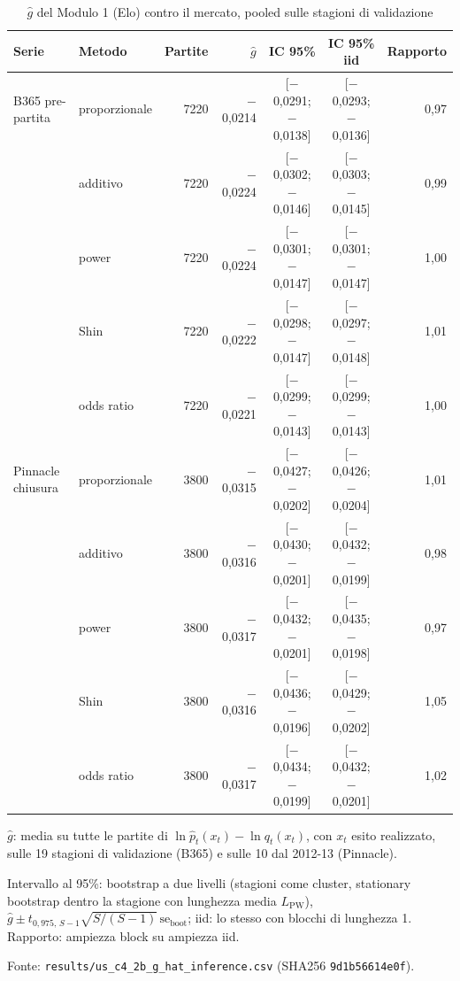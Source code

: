 \begin{table}[htbp]
\centering
\small
\caption{$\hat g$ del Modulo 1 (Elo) contro il mercato, pooled sulle stagioni di validazione}
\label{tab:c4_2_g_hat}
\begin{tabular}{llrrccr}
\toprule
Serie & Metodo & Partite & $\hat g$ & IC 95\% & IC 95\% iid & Rapporto \\
\midrule
B365 pre-partita & proporzionale & 7220 & $-$0,0214 & [$-$0,0291; $-$0,0138] & [$-$0,0293; $-$0,0136] & 0,97 \\
 & additivo & 7220 & $-$0,0224 & [$-$0,0302; $-$0,0146] & [$-$0,0303; $-$0,0145] & 0,99 \\
 & power & 7220 & $-$0,0224 & [$-$0,0301; $-$0,0147] & [$-$0,0301; $-$0,0147] & 1,00 \\
 & Shin & 7220 & $-$0,0222 & [$-$0,0298; $-$0,0147] & [$-$0,0297; $-$0,0148] & 1,01 \\
 & odds ratio & 7220 & $-$0,0221 & [$-$0,0299; $-$0,0143] & [$-$0,0299; $-$0,0143] & 1,00 \\
\midrule
Pinnacle chiusura & proporzionale & 3800 & $-$0,0315 & [$-$0,0427; $-$0,0202] & [$-$0,0426; $-$0,0204] & 1,01 \\
 & additivo & 3800 & $-$0,0316 & [$-$0,0430; $-$0,0201] & [$-$0,0432; $-$0,0199] & 0,98 \\
 & power & 3800 & $-$0,0317 & [$-$0,0432; $-$0,0201] & [$-$0,0435; $-$0,0198] & 0,97 \\
 & Shin & 3800 & $-$0,0316 & [$-$0,0436; $-$0,0196] & [$-$0,0429; $-$0,0202] & 1,05 \\
 & odds ratio & 3800 & $-$0,0317 & [$-$0,0434; $-$0,0199] & [$-$0,0432; $-$0,0201] & 1,02 \\
\bottomrule
\end{tabular}

\smallskip
\begin{minipage}{\linewidth}
\footnotesize
$\hat g$: media su tutte le partite di $\ln \hat p_t(x_t) - \ln q_t(x_t)$, con $x_t$ esito realizzato, sulle 19 stagioni di validazione (B365) e sulle 10 dal 2012-13 (Pinnacle).\par
Intervallo al 95\%: bootstrap a due livelli (stagioni come cluster, stationary bootstrap dentro la stagione con lunghezza media $L_{\mathrm{PW}}$), $\hat g \pm t_{0{,}975,\,S-1}\sqrt{S/(S-1)}\,\mathrm{se}_{\mathrm{boot}}$; iid: lo stesso con blocchi di lunghezza 1. Rapporto: ampiezza block su ampiezza iid.\par
Fonte: \texttt{results/us\_c4\_2b\_g\_hat\_inference.csv} (SHA256 \texttt{9d1b56614e0f}).
\end{minipage}
\end{table}
